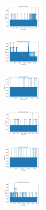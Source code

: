 \begin{figure}[H]
\begin{subfigure}
        \centering
        \includegraphics[width=0.234\textwidth]{img/hs/rand_set_const_20_277451237_time.png}
    \end{subfigure}
    \hfill
    \begin{subfigure}
        \centering
        \includegraphics[width=0.234\textwidth]{img/hs/newthyroid_set_const_20_277451237_time.png}
    \end{subfigure}
    \hfill
    \begin{subfigure}
        \centering
        \includegraphics[width=0.234\textwidth]{img/hs/iris_set_const_20_49258669_time.png}
    \end{subfigure}
    \hfill
    \begin{subfigure}
        \centering
        \includegraphics[width=0.234\textwidth]{img/hs/ecoli_set_const_20_49258669_time.png}
    \end{subfigure}
    \hfill
    \begin{subfigure}
        \centering
        \includegraphics[width=0.234\textwidth]{img/hs/rand_set_const_20_49258669_time.png}
    \end{subfigure}
    \hfill
    \begin{subfigure}
        \centering
        \includegraphics[width=0.234\textwidth]{img/hs/newthyroid_set_const_20_49258669_time.png}

\end{subfigure}
\end{figure}
